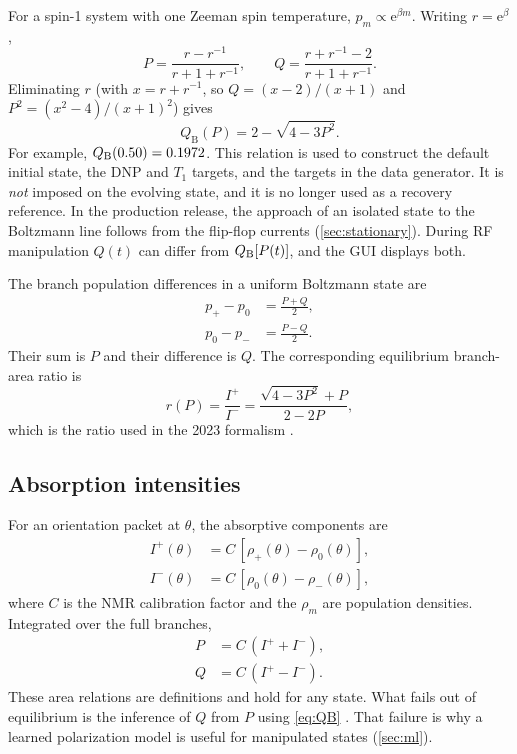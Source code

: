 \documentclass[11pt]{article}
\newcommand{\Iplus}{I^{+}}
\newcommand{\Iminus}{I^{-}}
\newcommand{\e}{\mathrm{e}}
\begin{document}
For a spin-1 system with one Zeeman spin temperature, \(p_m\propto\e^{\beta m}\). Writing
\(r=\e^{\beta}\),
\begin{equation}
  P=\frac{r-r^{-1}}{r+1+r^{-1}},\qquad
  Q=\frac{r+r^{-1}-2}{r+1+r^{-1}} .
\end{equation}
Eliminating \(r\) (with \(x=r+r^{-1}\), so \(Q=(x-2)/(x+1)\) and \(P^2=(x^2-4)/(x+1)^2\)) gives
\begin{equation}
  Q_{\mathrm B}(P)
  = 2-\sqrt{4-3P^2}.
  \label{eq:QB}
\end{equation}
For example, \(Q_{\rm B}(0.50)=0.1972\). This relation is used to construct the default initial
state, the DNP and \(T_1\) targets, and the targets in the data generator. It is \emph{not}
imposed on the evolving state, and it is no longer used as a recovery reference. In the
production release, the approach of an isolated state to the Boltzmann line follows from the
flip-flop currents (\cref{sec:stationary}). During RF manipulation \(Q(t)\) can differ from
\(Q_{\rm B}[P(t)]\), and the GUI displays both.

The branch population differences in a uniform Boltzmann state are
\begin{align}
  p_{+}-p_{0} &= \frac{P+Q}{2},
  \label{eq:branchdiffplus}\\
  p_{0}-p_{-} &= \frac{P-Q}{2}.
  \label{eq:branchdiffminus}
\end{align}
Their sum is \(P\) and their difference is \(Q\). The corresponding equilibrium branch-area ratio
is
\begin{equation}
  r(P)=\frac{I^{+}}{I^{-}}
  =\frac{\sqrt{4-3P^2}+P}{2-2P},
  \label{eq:branchratio}
\end{equation}
which is the ratio used in the 2023 formalism \cite{ClementKeller2023}.

\subsection{Absorption intensities}

For an orientation packet at \(\theta\), the absorptive components are
\begin{align}
  \Iplus(\theta)&=C\,[\rho_{+}(\theta)-\rho_{0}(\theta)],
  \label{eq:IplusTheta}\\
  \Iminus(\theta)&=C\,[\rho_{0}(\theta)-\rho_{-}(\theta)],
  \label{eq:IminusTheta}
\end{align}
where \(C\) is the NMR calibration factor and the \(\rho_m\) are population densities.
Integrated over the full branches,
\begin{align}
  P &= C\,(I^{+}+I^{-}),
  \label{eq:parea}\\
  Q &= C\,(I^{+}-I^{-}).
  \label{eq:qarea}
\end{align}
These area relations are definitions and hold for any state. What fails out of equilibrium is
the inference of \(Q\) from \(P\) using \cref{eq:QB} \cite{ClementKeller2023,Keller2026}. That
failure is why a learned polarization model is useful for manipulated states (\cref{sec:ml}).
\end{document}
